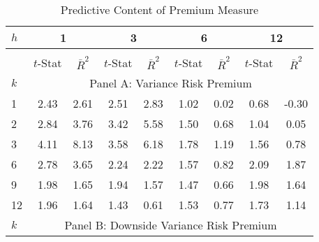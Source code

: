 \documentclass[11pt]{article}
\begin{document}
\clearpage
\newpage

\begin{table}
  \caption{Predictive Content of Premium Measure}\label{TabReturnRegressionResults}
  \begin{center}
        \begin{tabular}{lllllllll}
\hline
$h$ & \multicolumn{2}{c}{1} & \multicolumn{2}{c}{3} & \multicolumn{2}{c}{6} & \multicolumn{2}{c}{12} \\
\hline
 & \multicolumn{8}{c}{} \\
 & \multicolumn{1}{c}{$t$-Stat} & \multicolumn{1}{c}{$\bar{R}^2$} & \multicolumn{1}{c}{$t$-Stat} & \multicolumn{1}{c}{$\bar{R}^2$} & \multicolumn{1}{c}{$t$-Stat} & \multicolumn{1}{c}{$\bar{R}^2$} & \multicolumn{1}{c}{$t$-Stat} & \multicolumn{1}{c}{$\bar{R}^2$} \\
\hline
$k$ & \multicolumn{8}{c}{Panel A: Variance Risk Premium} \\
\hline
1 & \multicolumn{1}{c}{2.43} & \multicolumn{1}{c}{2.61} & \multicolumn{1}{c}{2.51} & \multicolumn{1}{c}{2.83} & \multicolumn{1}{c}{1.02} & \multicolumn{1}{c}{0.02} & \multicolumn{1}{c}{0.68} & \multicolumn{1}{c}{-0.30} \\
2 & \multicolumn{1}{c}{2.84} & \multicolumn{1}{c}{3.76} & \multicolumn{1}{c}{3.42} & \multicolumn{1}{c}{5.58} & \multicolumn{1}{c}{1.50} & \multicolumn{1}{c}{0.68} & \multicolumn{1}{c}{1.04} & \multicolumn{1}{c}{0.05} \\
3 & \multicolumn{1}{c}{4.11} & \multicolumn{1}{c}{8.13} & \multicolumn{1}{c}{3.58} & \multicolumn{1}{c}{6.18} & \multicolumn{1}{c}{1.78} & \multicolumn{1}{c}{1.19} & \multicolumn{1}{c}{1.56} & \multicolumn{1}{c}{0.78} \\
6 & \multicolumn{1}{c}{2.78} & \multicolumn{1}{c}{3.65} & \multicolumn{1}{c}{2.24} & \multicolumn{1}{c}{2.22} & \multicolumn{1}{c}{1.57} & \multicolumn{1}{c}{0.82} & \multicolumn{1}{c}{2.09} & \multicolumn{1}{c}{1.87} \\
9 & \multicolumn{1}{c}{1.98} & \multicolumn{1}{c}{1.65} & \multicolumn{1}{c}{1.94} & \multicolumn{1}{c}{1.57} & \multicolumn{1}{c}{1.47} & \multicolumn{1}{c}{0.66} & \multicolumn{1}{c}{1.98} & \multicolumn{1}{c}{1.64} \\
12 & \multicolumn{1}{c}{1.96} & \multicolumn{1}{c}{1.64} & \multicolumn{1}{c}{1.43} & \multicolumn{1}{c}{0.61} & \multicolumn{1}{c}{1.53} & \multicolumn{1}{c}{0.77} & \multicolumn{1}{c}{1.73} & \multicolumn{1}{c}{1.14} \\
\hline
$k$ & \multicolumn{8}{c}{Panel B: Downside Variance Risk Premium} \\

\end{tabular}
\end{center}
\end{table}
\end{document}
